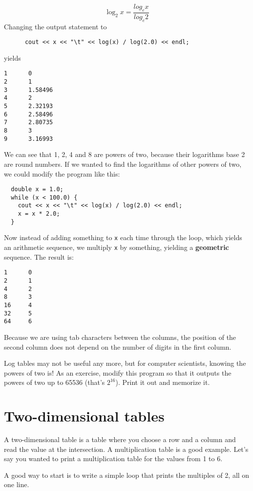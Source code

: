 \[ \log_2 x = \frac {log_e x}{log_e 2} \]
%
Changing the output statement to

\begin{lstlisting}
      cout << x << "\t" << log(x) / log(2.0) << endl;
\end{lstlisting}
%
yields

\begin{lstlisting}
1      0
2      1
3      1.58496
4      2
5      2.32193
6      2.58496
7      2.80735
8      3
9      3.16993
\end{lstlisting}
%
We can see that 1, 2, 4 and 8 are powers of two, because
their logarithms base 2 are round numbers.  If we wanted to find
the logarithms of other powers of two, we could modify the
program like this:

\begin{lstlisting}
  double x = 1.0;
  while (x < 100.0) {
    cout << x << "\t" << log(x) / log(2.0) << endl;
    x = x * 2.0;
  }
\end{lstlisting}
%
Now instead of adding something to {\tt x} each time through
the loop, which yields an arithmetic sequence, we multiply
{\tt x} by something, yielding a {\bf geometric} sequence.
The result is:

\begin{lstlisting}
1      0
2      1
4      2
8      3
16     4
32     5
64     6
\end{lstlisting}
%
Because we are using tab characters between the columns, the
position of the second column does not depend on the number
of digits in the first column.

Log tables may not be useful any more, but for computer scientists,
knowing the powers of two is!  As an exercise, modify this program
so that it outputs the powers of two up to 65536
(that's $2^{16}$).  Print it out and memorize it.

\section{Two-dimensional tables}

A two-dimensional table is a table where you choose a row and
a column and read the value at the intersection.  A multiplication
table is a good example.  Let's say you wanted to print a
multiplication table for the values from 1 to 6.

A good way to start is to write a simple loop that prints
the multiples of 2, all on one line.

